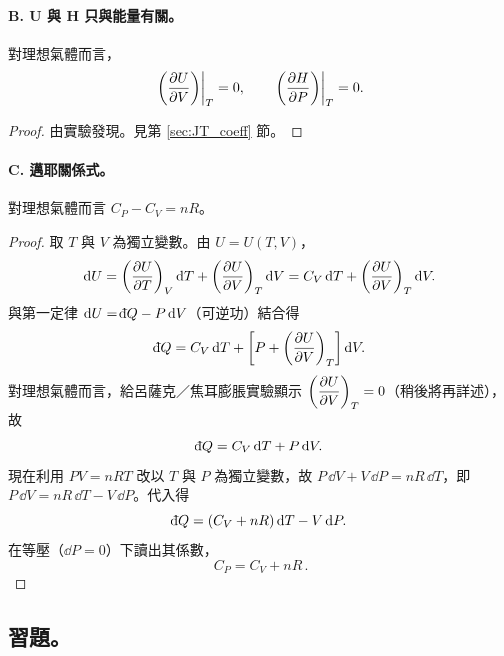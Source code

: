 \paragraph{B. U 與 H 只與能量有關。}
\begin{theorem}
    對理想氣體而言，
    \[
        \left.\left(\dfrac{\partial U}{\partial V}\right)\right|_T = 0, \qquad \left.\left(\dfrac{\partial H}{\partial P}\right)\right|_T = 0.
    \]
\end{theorem}
\begin{proof}
    由實驗發現。見第 \ref{sec:JT_coeff} 節。
\end{proof}

\paragraph{C. 邁耶關係式。}
\begin{theorem}
    對理想氣體而言 $C_P - C_V = nR$。
\end{theorem}

\begin{proof}
    取 $T$ 與 $V$ 為獨立變數。由 $U=U(T,V)$，
\[
    \mathrm{d} U = \left(\dfrac{\partial U}{\partial T}\right)_V \mathrm{d} T + \left(\dfrac{\partial U}{\partial V}\right)_T \mathrm{d} V = C_V\,\mathrm{d} T + \left(\dfrac{\partial U}{\partial V}\right)_T \mathrm{d} V.
\]
與第一定律 $\dd U = \dbar Q - P\,\dd V$（可逆功）結合得
\[
    \dbar Q = C_V\,\dd T + \left[P + \pa{U}{V}_T\right]\dd V.
\]
對理想氣體而言，給呂薩克／焦耳膨脹實驗顯示 $\left(\dfrac{\partial U}{\partial V}\right)_T = 0$（稍後將再詳述），故
\[
    \dbar Q = C_V\,\dd T + P\,\dd V.
\]
現在利用 $PV=nRT$ 改以 $T$ 與 $P$ 為獨立變數，故 $P\,\dd V + V\,\dd P = nR\,\dd T$，即 $P\,\dd V = nR\,\dd T - V\,\dd P$。代入得
\[
    \dbar Q = (C_V + nR)\,\dd T - V\,\dd P.
\]
在等壓（$\dd P = 0$）下讀出其係數，
\[
    \boxed{\,C_P = C_V + nR\,}.
\]
\end{proof}
\subsection{習題。}

